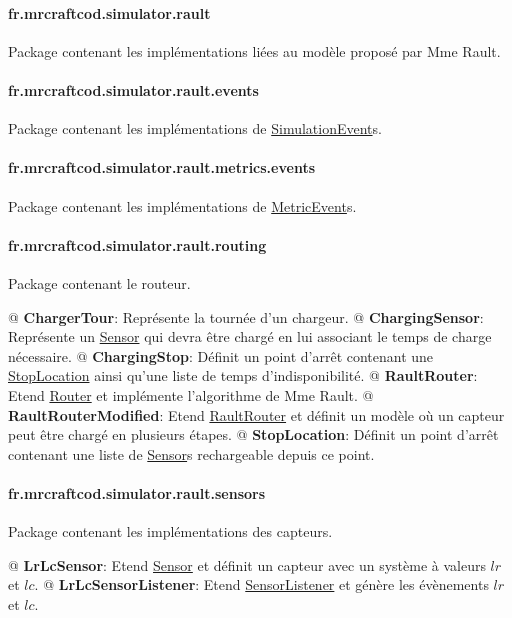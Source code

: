 \documentclass[final]{polytech/polytech}
\newcommand{\class}[1]{\textbf{#1}\label{class:#1}}
\newcommand{\klass}[1]{\hyperref[class:#1]{#1}}
\begin{document}
			\paragraph{fr.mrcraftcod.simulator.rault}
				Package contenant les implémentations liées au modèle proposé par Mme Rault.
				
			\paragraph{fr.mrcraftcod.simulator.rault.events}
				Package contenant les implémentations de \klass{SimulationEvent}s. 
				
			\paragraph{fr.mrcraftcod.simulator.rault.metrics.events}
				Package contenant les implémentations de \klass{MetricEvent}s. 
				
			\paragraph{fr.mrcraftcod.simulator.rault.routing}
				Package contenant le routeur.
				
				\begin{easylist}
					@ \class{ChargerTour}: Représente la tournée d'un chargeur.
					@ \class{ChargingSensor}: Représente un \klass{Sensor} qui devra être chargé en lui associant le temps de charge nécessaire.
					@ \class{ChargingStop}: Définit un point d'arrêt contenant une \klass{StopLocation} ainsi qu'une liste de temps d'indisponibilité.
					@ \class{RaultRouter}: Etend \klass{Router} et implémente l'algorithme de Mme Rault.
					@ \class{RaultRouterModified}: Etend \klass{RaultRouter} et définit un modèle où un capteur peut être chargé en plusieurs étapes.
					@ \class{StopLocation}: Définit un point d'arrêt contenant une liste de \klass{Sensor}s rechargeable depuis ce point.
				\end{easylist}
			
			\paragraph{fr.mrcraftcod.simulator.rault.sensors}
				Package contenant les implémentations des capteurs.
				
				\begin{easylist}
					@ \class{LrLcSensor}: Etend \klass{Sensor} et définit un capteur avec un système à valeurs $lr$ et $lc$.
					@ \class{LrLcSensorListener}: Etend \klass{SensorListener} et génère les évènements $lr$ et $lc$.
				\end{easylist}
			
\end{document}

